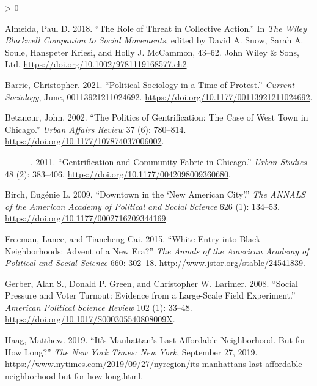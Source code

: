 \documentclass[
  12pt,
]{article}
\newlength{\cslhangindent}
\newenvironment{CSLReferences}[2] %
 {%
  \setlength{\parindent}{0pt}
  \ifodd #1 \everypar{\setlength{\hangindent}{\cslhangindent}}\ignorespaces\fi
  \ifnum #2 > 0
  \setlength{\parskip}{#2\baselineskip}
  \fi
 }%
 {}
\begin{document}
\hypertarget{refs}{}
\begin{CSLReferences}{1}{0}
\leavevmode\hypertarget{ref-Almeida2018}{}%
Almeida, Paul D. 2018. {``The {Role} of {Threat} in {Collective Action}.''} In \emph{The {Wiley Blackwell Companion} to {Social Movements}}, edited by David A. Snow, Sarah A. Soule, Hanspeter Kriesi, and Holly J. McCammon, 43--62. {John Wiley \& Sons, Ltd}. \url{https://doi.org/10.1002/9781119168577.ch2}.

\leavevmode\hypertarget{ref-Barrie2021}{}%
Barrie, Christopher. 2021. {``Political Sociology in a Time of Protest.''} \emph{Current Sociology}, June, 00113921211024692. \url{https://doi.org/10.1177/00113921211024692}.

\leavevmode\hypertarget{ref-Betancur2002}{}%
Betancur, John. 2002. {``The {Politics} of {Gentrification}: {The Case} of {West Town} in {Chicago}.''} \emph{Urban Affairs Review} 37 (6): 780--814. \url{https://doi.org/10.1177/107874037006002}.

\leavevmode\hypertarget{ref-Betancur2011}{}%
---------. 2011. {``Gentrification and {Community Fabric} in {Chicago}.''} \emph{Urban Studies} 48 (2): 383--406. \url{https://doi.org/10.1177/0042098009360680}.

\leavevmode\hypertarget{ref-Birch2009}{}%
Birch, Eugénie L. 2009. {``Downtown in the {`{New American City}'}.''} \emph{The ANNALS of the American Academy of Political and Social Science} 626 (1): 134--53. \url{https://doi.org/10.1177/0002716209344169}.

\leavevmode\hypertarget{ref-Freeman2015}{}%
Freeman, Lance, and Tiancheng Cai. 2015. {``White {Entry} into {Black Neighborhoods}: {Advent} of a {New Era}?''} \emph{The Annals of the American Academy of Political and Social Science} 660: 302--18. \url{http://www.jstor.org/stable/24541839}.

\leavevmode\hypertarget{ref-Gerber2008}{}%
Gerber, Alan S., Donald P. Green, and Christopher W. Larimer. 2008. {``Social {Pressure} and {Voter Turnout}: {Evidence} from a {Large}-{Scale Field Experiment}.''} \emph{American Political Science Review} 102 (1): 33--48. \url{https://doi.org/10.1017/S000305540808009X}.

\leavevmode\hypertarget{ref-Haag2019}{}%
Haag, Matthew. 2019. {``It's {Manhattan}'s {Last Affordable Neighborhood}. {But} for {How Long}?''} \emph{The New York Times: New York}, September 27, 2019. \url{https://www.nytimes.com/2019/09/27/nyregion/its-manhattans-last-affordable-neighborhood-but-for-how-long.html}.


\end{CSLReferences}
\end{document}
